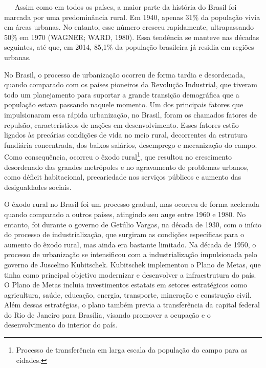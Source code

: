 \documentclass[
  12pt,
  a4paper,
]{scrreprt}
\begin{document}
~~~Assim como em todos os países, a maior parte da história do Brasil
foi marcada por uma predominância rural. Em 1940, apenas 31\% da
população vivia em áreas urbanas. No entanto, esse número cresceu
rapidamente, ultrapassando 50\% em 1970 (WAGNER; WARD, 1980). Essa
tendência se manteve nas décadas seguintes, até que, em 2014, 85,1\% da
população brasileira já residia em regiões urbanas.

\vspace{12pt}

No Brasil, o processo de urbanização ocorreu de forma tardia e
desordenada, quando comparado com os países pioneiros da Revolução
Industrial, que tiveram todo um planejamento para suportar a grande
transição demográfica que a população estava passando naquele momento.
Um dos principais fatores que impulsionaram essa rápida urbanização, no
Brasil, foram os chamados fatores de repulsão, característicos de nações
em desenvolvimento. Esses fatores estão ligados às precárias condições
de vida no meio rural, decorrentes da estrutura fundiária concentrada,
dos baixos salários, desemprego e mecanização do campo. Como
consequência, ocorreu o êxodo rural\footnote{Processo de transferência
  em larga escala da população do campo para as cidades.}, que resultou
no crescimento desordenado das grandes metrópoles e no agravamento de
problemas urbanos, como déficit habitacional, precariedade nos serviços
públicos e aumento das desigualdades sociais.

\vspace{12pt}

O êxodo rural no Brasil foi um processo gradual, mas ocorreu de forma
acelerada quando comparado a outros países, atingindo seu auge entre
1960 e 1980. No entanto, foi durante o governo de Getúlio Vargas, na
década de 1930, com o início do processo de industrialização, que
surgiram as condições específicas para o aumento do êxodo rural, mas
ainda era bastante limitado. Na década de 1950, o processo de
urbanização se intensificou com a industrialização impulsionada pelo
governo de Juscelino Kubitschek. Kubitschek implementou o Plano de
Metas, que tinha como principal objetivo modernizar e desenvolver a
infraestrutura do país. O Plano de Metas incluia investimentos estatais
em setores estratégicos como agricultura, saúde, educação, energia,
transporte, mineração e construção civil. Além dessas estratégias, o
plano também previa a transferência da capital federal do Rio de Janeiro
para Brasília, visando promover a ocupação e o desenvolvimento do
interior do país.
\end{document}
